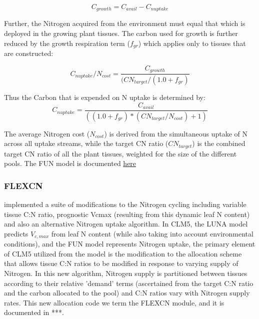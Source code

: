 \documentclass[draft,linenumbers]{agujournal}
\begin{document}
\begin{equation}
C_{growth}=C_{avail}-C_{nuptake}
\end{equation}

Further, the Nitrogen acquired from the environment must equal that which is deployed in the growing plant tissues. The carbon used for growth is further reduced by the growth respiration term ($f_{gr}$) which applies only to tissues that are constructed:

\begin{equation}
C_{nuptake}/N_{cost} =\frac{C_{growth}}{(CN_{target}/(1.0+f_{gr})}
\end{equation}

Thus the Carbon that is expended on N uptake is determined by:
\begin{equation}
C_{nuptake} =\frac{C_{avail}}{ ( (1.0+f_{gr})*(CN_{target} / N_{cost}) + 1) }
\end{equation}

The average Nitrogen cost ($N_{cost}$) is derived from the simultaneous uptake of N across all uptake streams, while the target CN ratio ($CN_{target}$) is the combined target CN ratio of all the plant tissues, weighted for the size of the different pools. The FUN model is documented \href{https://escomp.github.io/ctsm-docs/doc/build/html/tech_note/FUN/CLM50_Tech_Note_FUN.html}{here}

\subsubsection{FLEXCN}
\cite{ghimire2016} implemented a suite of modifications to the Nitrogen cycling including variable tissue C:N ratio, prognostic Vcmax (resulting from this dynamic leaf N content) and also an alternative Nitrogen uptake algorithm. In CLM5, the LUNA model predicts $V_{c,max}$ from leaf N content (while also taking into account environmental conditions), and the FUN model represents Nitrogen uptake, the primary element of CLM5 utilized from the \cite{ghimire2016} model is the modification to the allocation scheme that allows tissue C:N ratios to be modified in response to varying supply of Nitrogen. In this new algorithm, Nitrogen supply is partitioned between tissues according to their relative 'demand' terms (ascertained from the target C:N ratio and the carbon allocated to the pool) and C:N ratios vary with Nitrogen supply rates. This new allocation code we term the FLEXCN module, and it is documented in ***. 
\end{document}
